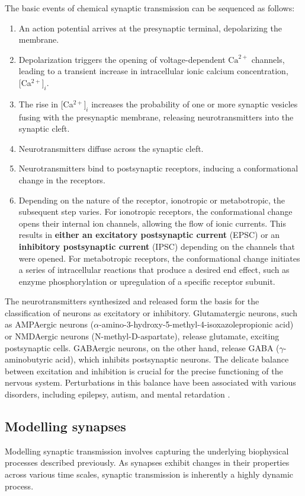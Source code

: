 \documentclass[../main.tex]{subfiles}
\begin{document}
The basic events of chemical synaptic transmission can be sequenced as follows:
\begin{enumerate}
    \item An action potential arrives at the presynaptic terminal, depolarizing the membrane.
    \item Depolarization triggers the opening of voltage-dependent $\text{Ca}^{2+}$ channels, leading to a transient increase in intracellular ionic calcium concentration, [Ca$^{2+}]_i$.
    \item The rise in [Ca$^{2+}]_i$ increases the probability of one or more synaptic vesicles fusing with the presynaptic membrane, releasing neurotransmitters into the synaptic cleft.
    \item Neurotransmitters diffuse across the synaptic cleft.
    \item Neurotransmitters bind to postsynaptic receptors, inducing a conformational change in the receptors.
    \item Depending on the nature of the receptor, ionotropic or metabotropic, the subsequent step varies.
    For ionotropic receptors, the conformational change opens their internal ion channels, allowing the flow of ionic currents.
    This results in \textbf{either an excitatory postsynaptic current} (EPSC) or an \textbf{inhibitory postsynaptic current} (IPSC) depending on the channels that were opened.
    For metabotropic receptors, the conformational change initiates a series of intracellular reactions that produce a desired end effect, such as enzyme phosphorylation or upregulation of a specific receptor subunit.
\end{enumerate}

The neurotransmitters synthesized and released form the basis for the classification of neurons as excitatory or inhibitory. 
Glutamatergic neurons, such as AMPAergic neurons ($\alpha$-amino-3-hydroxy-5-methyl-4-isoxazolepropionic acid) or NMDAergic neurons (N-methyl-D-aspartate), release glutamate, exciting postsynaptic cells. 
GABAergic neurons, on the other hand, release GABA ($\gamma$-aminobutyric acid), which inhibits postsynaptic neurons.
The delicate balance between excitation and inhibition is crucial for the precise functioning of the nervous system.
Perturbations in this balance have been associated with various disorders, including epilepsy, autism, and mental retardation \cite{villa_excitatory_2016}.
\subsection{Modelling synapses}
Modelling synaptic transmission involves capturing the underlying biophysical processes described previously.
As synapses exhibit changes in their properties across various time scales, synaptic transmission is inherently a highly dynamic process.
\end{document}
